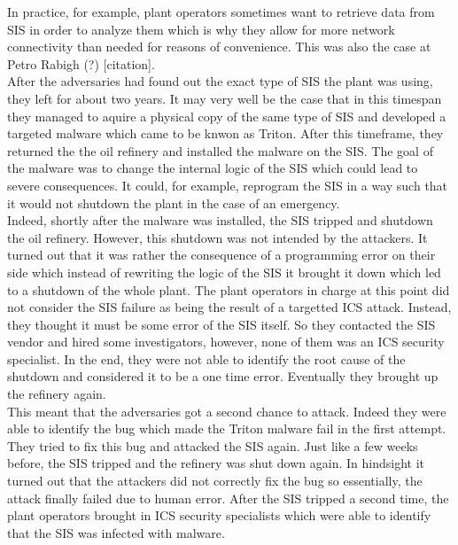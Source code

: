 \documentclass[runningheads]{llncs}
\begin{document}
In practice, for example, plant operators sometimes want to retrieve data from SIS in order to analyze them which is why they allow for more network connectivity than needed for reasons of convenience.
This was also the case at Petro Rabigh (?) [citation].
\cite{dragos.17}\\
After the adversaries had found out the exact type of SIS the plant was using, they left for about two years.
It may very well be the case that in this timespan they managed to aquire a physical copy of the same type of SIS and developed a targeted malware which came to be knwon as Triton.
After this timeframe, they returned the the oil refinery and installed the malware on the SIS.
The goal of the malware was to change the internal logic of the SIS which could lead to severe consequences.
It could, for example, reprogram the SIS in a way such that it would not shutdown the plant in the case of an emergency. \cite{lee.20}\\
Indeed, shortly after the malware was installed, the SIS tripped and shutdown the oil refinery.
However, this shutdown was not intended by the attackers.
It turned out that it was rather the consequence of a programming error on their side which instead of rewriting the logic of the SIS it brought it down which led to a shutdown of the whole plant.
The plant operators in charge at this point did not consider the SIS failure as being the result of a targetted ICS attack.
Instead, they thought it must be some error of the SIS itself.
So they contacted the SIS vendor and hired some investigators, however, none of them was an ICS security specialist.
In the end, they were not able to identify the root cause of the shutdown and considered it to be a one time error.
Eventually they brought up the refinery again. \cite{lee.20}\\
This meant that the adversaries got a second chance to attack.
Indeed they were able to identify the bug which made the Triton malware fail in the first attempt.
They tried to fix this bug and attacked the SIS again.
Just like a few weeks before, the SIS tripped and the refinery was shut down again.
In hindsight it turned out that the attackers did not correctly fix the bug so essentially, the attack finally failed due to human error.
After the SIS tripped a second time, the plant operators brought in ICS security specialists which were able to identify that the SIS was infected with malware.
\end{document}
